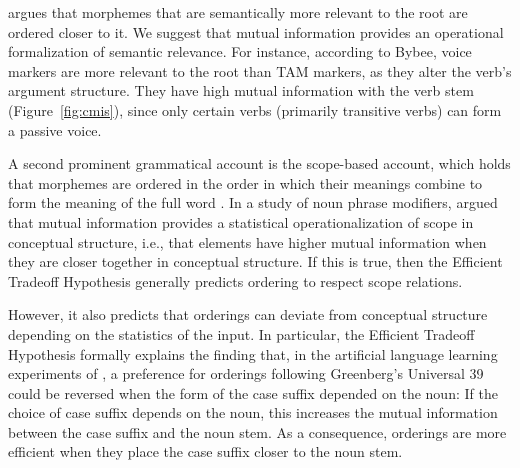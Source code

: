 \documentclass[man]{apa7}
\newcommand{\citep}{\parencite}
\newcommand{\citet}{\Textcite}
\begin{document}
\citet{bybee-morphology-1985} argues that morphemes that are semantically more relevant to the root are ordered closer to it.
We suggest that mutual information provides an operational formalization of semantic relevance.
For instance, according to Bybee, voice markers are more relevant to the root than TAM markers, as they alter the verb's argument structure.
They have high mutual information with the verb stem (Figure~\ref{fig:cmis}), since only certain verbs (primarily transitive verbs) can form a passive voice.

A second prominent grammatical account is the scope-based account, which holds that morphemes are ordered in the order in which their meanings combine to form the meaning of the full word \citep{rice2000morpheme}.
In a study of noun phrase modifiers, \citet{culbertson2020from} argued that mutual information provides a statistical operationalization of scope in conceptual structure, i.e., that elements have higher mutual information when they are closer together in conceptual structure.
If this is true, then the Efficient Tradeoff Hypothesis generally predicts ordering to respect scope relations.

However, it also predicts that orderings can deviate from conceptual structure depending on the statistics of the input.
In particular, the Efficient Tradeoff Hypothesis formally explains the finding that, in the artificial language learning experiments of \citet{saldana2021cross}, a preference for orderings following Greenberg's Universal 39 could be reversed when the form of the case suffix depended on the noun:
If the choice of case suffix depends on the noun, this increases the mutual information between the case suffix and the noun stem.
As a consequence, orderings are more efficient when they place the case suffix closer to the noun stem.

\end{document}
